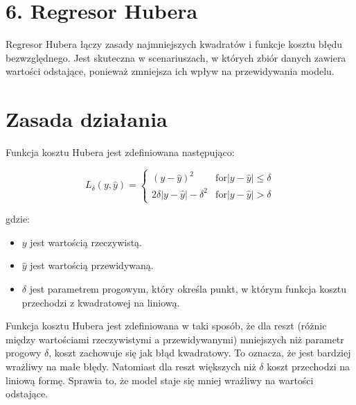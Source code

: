 {}
\justify
\fontsize{14}{16}\selectfont
\setlength{\parindent}{0pt}
\section*{6. Regresor Hubera \cite{huber1964robust}}
\fontsize{12}{14}\selectfont
\vspace{-1.0em}

\hspace{1.5cm} Regresor Hubera łączy zasady najmniejszych kwadratów i funkcje kosztu błędu bezwzględnego. Jest skuteczna w scenariuszach, w których zbiór danych zawiera wartości odstające, ponieważ zmniejsza ich wpływ na przewidywania modelu. 

{}
\section*{Zasada działania \cite{hastie2009elements}}
\vspace{-1.0em}

Funkcja kosztu Hubera jest zdefiniowana następująco:

$$
L_\delta( y, \hat{y} ) = \begin{cases}
    ( y - \hat{y} )^2 & \text{for} | y - \hat{y} | \leq \delta \\
    2 \delta  | y - \hat{y} | - \delta^2  & \text{for} | y - \hat{y} | > \delta
\end{cases}
$$

gdzie:
\begin{itemize}
\setlength\itemsep{-0.5em}
\item $y$ jest wartością rzeczywistą.

 \item  $\hat{y}$ jest wartością przewidywaną.

 \item  $\delta$ jest parametrem progowym, który określa punkt, w którym funkcja kosztu przechodzi z kwadratowej na liniową.
\end{itemize}

\hspace{1.5cm} Funkcja kosztu Hubera jest zdefiniowana w taki sposób, że dla reszt (różnic między wartościami rzeczywistymi a przewidywanymi) mniejszych niż parametr progowy $\delta$, koszt zachowuje się jak błąd kwadratowy. To oznacza, że jest bardziej wrażliwy na małe błędy. Natomiast dla reszt większych niż $\delta$ koszt przechodzi na liniową formę. Sprawia to, że model staje się mniej wrażliwy na wartości odstające. 

